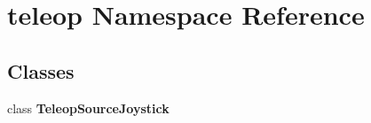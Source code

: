 \section{teleop Namespace Reference}
\label{namespaceteleop}
\subsection*{Classes}
\begin{DoxyCompactItemize}
\item 
class {\bf TeleopSourceJoystick}
\end{DoxyCompactItemize}
